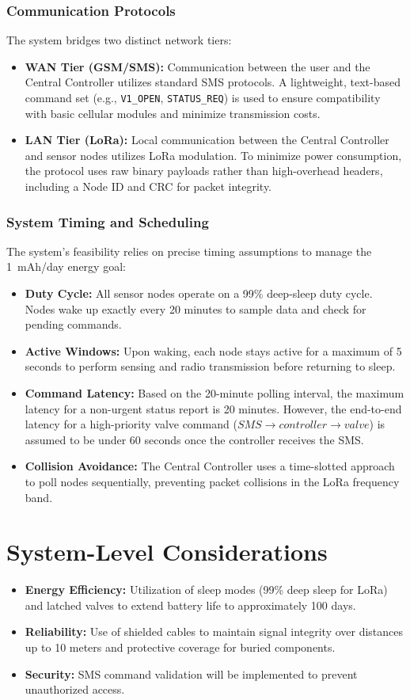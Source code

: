 \documentclass[conference]{IEEEtran}
\begin{document}
\subsubsection{Communication Protocols}
The system bridges two distinct network tiers:
\begin{itemize}
    \item \textbf{WAN Tier (GSM/SMS):} Communication between the user and the Central Controller utilizes standard SMS protocols. A lightweight, text-based command set (e.g., \texttt{V1\_OPEN}, \texttt{STATUS\_REQ}) is used to ensure compatibility with basic cellular modules and minimize transmission costs.
    \item \textbf{LAN Tier (LoRa):} Local communication between the Central Controller and sensor nodes utilizes LoRa modulation. To minimize power consumption, the protocol uses raw binary payloads rather than high-overhead headers, including a Node ID and CRC for packet integrity.
\end{itemize}

\subsubsection{System Timing and Scheduling}
The system's feasibility relies on precise timing assumptions to manage the 1~mAh/day energy goal:
\begin{itemize}
    \item \textbf{Duty Cycle:} All sensor nodes operate on a 99\% deep-sleep duty cycle. Nodes wake up exactly every 20 minutes to sample data and check for pending commands.
    \item \textbf{Active Windows:} Upon waking, each node stays active for a maximum of 5 seconds to perform sensing and radio transmission before returning to sleep.
    \item \textbf{Command Latency:} Based on the 20-minute polling interval, the maximum latency for a non-urgent status report is 20 minutes. However, the end-to-end latency for a high-priority valve command ($SMS \rightarrow controller \rightarrow valve$) is assumed to be under 60 seconds once the controller receives the SMS.
    \item \textbf{Collision Avoidance:} The Central Controller uses a time-slotted approach to poll nodes sequentially, preventing packet collisions in the LoRa frequency band.
\end{itemize}
\section{System-Level Considerations}
\begin{itemize}
    \item \textbf{Energy Efficiency:} Utilization of sleep modes (99\% deep sleep for LoRa) and latched valves to extend battery life to approximately 100 days.
    \item \textbf{Reliability:} Use of shielded cables to maintain signal integrity over distances up to 10 meters and protective coverage for buried components.
    \item \textbf{Security:} SMS command validation will be implemented to prevent unauthorized access.
\end{itemize}
\end{document}
